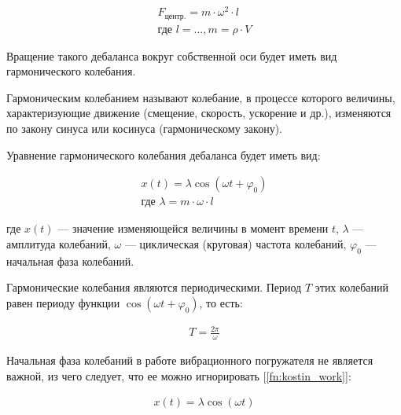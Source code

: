 \begin{equation}\label{eq:centrifugal}
    \begin{gathered}
        F_{\textrm{центр.}} = m \cdot \omega^2 \cdot l \\
        \textrm{где } l = ... , m = \rho \cdot V
    \end{gathered}
\end{equation}

Вращение такого дебаланса вокруг собственной оси будет иметь вид гармонического колебания.

\begin{definition}
    Гармоническим колебанием называют колебание, в процессе которого величины, характеризующие движение (смещение, скорость, ускорение и др.), изменяются по закону синуса или косинуса (гармоническому закону).
\end{definition}

Уравнение гармонического колебания дебаланса будет иметь вид:

\begin{equation}\label{eq:harmonic}
    \begin{gathered}
        x(t) = \lambda \cos (\omega t + \varphi_0) \\
        \textrm{где } \lambda = m \cdot \omega \cdot l
    \end{gathered}
\end{equation}

где $x(t)$  — значение изменяющейся величины в момент времени $t$, $\lambda$ — амплитуда колебаний, $\omega$ — циклическая (круговая) частота колебаний, $\varphi_0$ — начальная фаза колебаний.

Гармонические колебания являются периодическими. Период $T$ этих колебаний равен периоду функции $\cos (\omega t + \varphi_0)$, то есть:

\begin{equation*}
    \begin{aligned}
        T = \frac{2 \pi}{\omega}
    \end{aligned}
\end{equation*}

Начальная фаза колебаний в работе вибрационного погружателя не является важной, из чего следует, что ее можно игнорировать [\ref{fn:kostin_work}]:


\begin{equation}\label{eq:harmonic_notphi}
    \begin{aligned}
        x(t) = \lambda \cos (\omega t)
    \end{aligned}
\end{equation}

